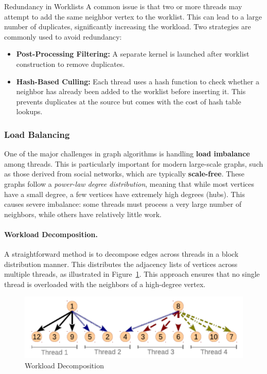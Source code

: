 \documentclass[12pt]{book}
\begin{document}
{Redundancy in Worklists}
A common issue is that two or more threads may attempt to add the same neighbor vertex to the worklist. This can lead to a large number of duplicates, significantly increasing the workload. Two strategies are commonly used to avoid redundancy:

\begin{itemize}
    \item \textbf{Post-Processing Filtering:} A separate kernel is launched after worklist construction to remove duplicates.  
    \item \textbf{Hash-Based Culling:} Each thread uses a hash function to check whether a neighbor has already been added to the worklist before inserting it. This prevents duplicates at the source but comes with the cost of hash table lookups.
\end{itemize}

\subsubsection*{Load Balancing}
One of the major challenges in graph algorithms is handling \textbf{load imbalance} among threads. This is particularly important for modern large-scale graphs, such as those derived from social networks, which are typically \textbf{scale-free}. These graphs follow a \emph{power-law degree distribution}, meaning that while most vertices have a small degree, a few vertices have extremely high degrees (hubs). This causes severe imbalance: some threads must process a very large number of neighbors, while others have relatively little work.

\paragraph{Workload Decomposition.}  
A straightforward method is to decompose edges across threads in a block distribution manner. This distributes the adjacency lists of vertices across multiple threads, as illustrated in Figure~\ref{fig:workloaddecomposition}. This approach ensures that no single thread is overloaded with the neighbors of a high-degree vertex.
\begin{figure}
    \centering
    \includegraphics[width=0.65\linewidth]{images/threadwload.png}
    \caption{Workload Decomposition}
    \label{fig:workloaddecomposition}
\end{figure}
\end{document}
